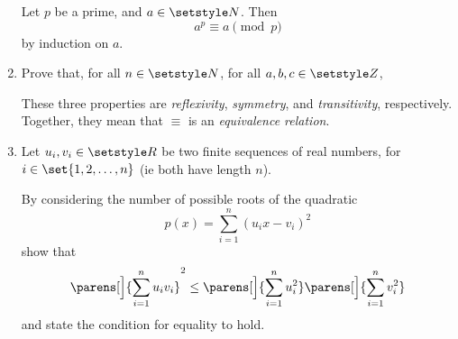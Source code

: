 \begin{enumerate}
  Let \(p\) be a prime, and \(a \in \Naturals\). Then
  \begin{equation*}
   a^p \equiv a \pmod p
  \end{equation*}
  by induction on \(a\).
 \item
  Prove that, for all \(n \in \Naturals\), for all \(a, b, c \in \Integers\),
  These three properties are \emph{reflexivity}, \emph{symmetry}, and
  \emph{transitivity}, respectively. Together, they mean that \(\equiv\) is an
  \emph{equivalence relation}.
 \item
  Let \(u_i, v_i \in \Reals\) be two finite sequences of real numbers, for
  \(i \in \set{1, 2, \dotsc, n}\) (ie both have length \(n\)).

  By considering the number of possible roots of the quadratic
  \begin{equation*}
   p(x) = \sum_{i = 1}^n (u_i x - v_i)^2
  \end{equation*}
  show that
  \begin{equation*}
   \parens[\Big]{\sum_{i = 1}^n u_i v_i}^2
   \le \parens[\Big]{\sum_{i = 1}^n u_i^2}
       \parens[\Big]{\sum_{i = 1}^n v_i^2}
  \end{equation*}
  and state the condition for equality to hold.


\end{enumerate}
